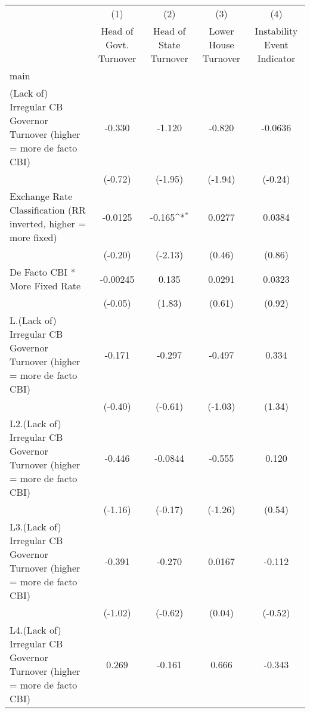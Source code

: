 {
\def\sym#1{\ifmmode^{#1}\else\(^{#1}\)\fi}
\begin{tabular}{l*{4}{c}}
\hline\hline
                &\multicolumn{1}{c}{(1)}&\multicolumn{1}{c}{(2)}&\multicolumn{1}{c}{(3)}&\multicolumn{1}{c}{(4)}\\
                &\multicolumn{1}{c}{Head of Govt. Turnover}&\multicolumn{1}{c}{Head of State Turnover}&\multicolumn{1}{c}{Lower House Turnover}&\multicolumn{1}{c}{Instability Event Indicator}\\
\hline
main            &                  &                  &                  &                  \\
(Lack of) Irregular CB Governor Turnover (higher = more de facto CBI)&   -0.330         &   -1.120         &   -0.820         &  -0.0636         \\
                &  (-0.72)         &  (-1.95)         &  (-1.94)         &  (-0.24)         \\
[1em]
Exchange Rate Classification (RR inverted, higher = more fixed)&  -0.0125         &   -0.165\sym{*}  &   0.0277         &   0.0384         \\
                &  (-0.20)         &  (-2.13)         &   (0.46)         &   (0.86)         \\
[1em]
De Facto CBI * More Fixed Rate& -0.00245         &    0.135         &   0.0291         &   0.0323         \\
                &  (-0.05)         &   (1.83)         &   (0.61)         &   (0.92)         \\
[1em]
L.(Lack of) Irregular CB Governor Turnover (higher = more de facto CBI)&   -0.171         &   -0.297         &   -0.497         &    0.334         \\
                &  (-0.40)         &  (-0.61)         &  (-1.03)         &   (1.34)         \\
[1em]
L2.(Lack of) Irregular CB Governor Turnover (higher = more de facto CBI)&   -0.446         &  -0.0844         &   -0.555         &    0.120         \\
                &  (-1.16)         &  (-0.17)         &  (-1.26)         &   (0.54)         \\
[1em]
L3.(Lack of) Irregular CB Governor Turnover (higher = more de facto CBI)&   -0.391         &   -0.270         &   0.0167         &   -0.112         \\
                &  (-1.02)         &  (-0.62)         &   (0.04)         &  (-0.52)         \\
[1em]
L4.(Lack of) Irregular CB Governor Turnover (higher = more de facto CBI)&    0.269         &   -0.161         &    0.666         &   -0.343         \\

\end{tabular}}
